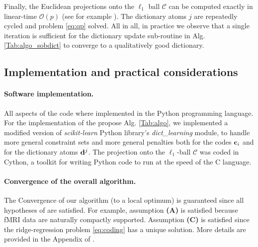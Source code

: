 Finally, the Euclidean projections onto the $\ell_1$ ball $\mathcal C$
can be computed exactly in linear-time $\mathcal O(p)$ (see for example
  \citep{condat2014fast,duchi2008efficient}).
The dictionary atoms $j$ are repeatedly cycled and problem \eqref{eq:qp} solved. %
All in all, in practice  we observe that a single iteration is sufficient
for the dictionary update sub-routine in Alg. \ref{Tab:algo_sobdict}
to converge to a qualitatively good dictionary.

\subsection{Implementation and practical considerations}

\paragraph{Software implementation.} All aspects of the code where
implemented in the Python programming language. 
For the implementation of the propose Alg. \ref{Tab:algo}, we
implemented a modified version of \textit{scikit-learn} Python library's
  \textit{dict\_learning} module, to handle more general constraint sets
  and more general penalties both for the codes $\mathbf{c}_i$ and for the
  dictionary atoms $\mathbf{d}^j$. The projection onto the $\ell_1$-ball $\mathcal C$ was coded in Cython, a toolkit for writing Python code to run at the speed of the C language.

\paragraph*{Convergence of the overall algorithm.}
The Convergence of our algorithm (to a local optimum) is guaranteed since all hypotheses of   \citep{mairal2010} are satisfied. For example, assumption \textbf{(A)} is satisfied because fMRI data are naturally compactly supported. Assumption \textbf{(C)} is satisfied since the ridge-regression problem \eqref{eq:coding} has a unique solution. More details are provided in the
Appendix of   \citep{dohmatob2016}.

